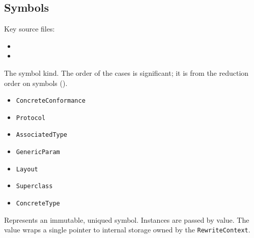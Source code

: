 \documentclass[../generics]{subfiles}
\begin{document}
\subsection*{Symbols}

Key source files:
\begin{itemize}
\item {}
\item {}
\end{itemize}

The symbol kind. The order of the cases is significant; it is from the reduction order on symbols ().
\begin{itemize}
\item \texttt{ConcreteConformance}
\item \texttt{Protocol}
\item \texttt{AssociatedType}
\item \texttt{GenericParam}
\item \texttt{Layout}
\item \texttt{Superclass}
\item \texttt{ConcreteType}
\end{itemize}

Represents an immutable, uniqued symbol. Instances are passed by value. The value wraps a single pointer to internal storage owned by the \texttt{RewriteContext}.
\end{document}
